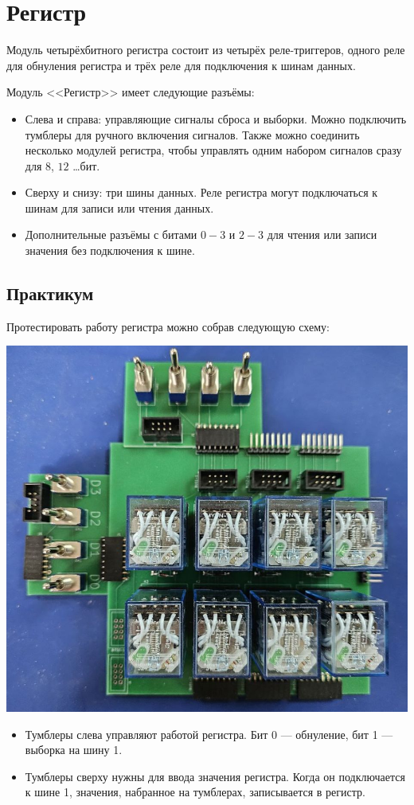 \documentclass{book}
\begin{document}
\section{Регистр}

Модуль четырёхбитного регистра состоит из четырёх реле-триггеров,
одного реле для обнуления регистра и трёх реле для подключения
к шинам данных.

Модуль <<Регистр>> имеет следующие разъёмы:
\begin{itemize}
  \item Слева и справа: управляющие сигналы сброса и выборки.
        Можно подключить тумблеры
        для ручного включения сигналов. Также можно соединить несколько
        модулей регистра, чтобы управлять одним набором сигналов сразу
        для $8$, $12$ \ldots бит.
  \item Сверху и снизу: три шины данных. Реле регистра могут
        подключаться к шинам для записи или чтения данных.
  \item Дополнительные разъёмы с битами $0-3$ и $2-3$ для чтения или
        записи значения без подключения к шине.
\end{itemize}

\subsection{Практикум}

Протестировать работу регистра можно собрав следующую схему:

\includegraphics[width=0.5\columnwidth]{photo/register.jpg}

\begin{itemize}
  \item Тумблеры слева управляют работой регистра. Бит 0 --- обнуление, бит 1 --- выборка на шину 1.
  \item Тумблеры сверху нужны для ввода значения регистра. Когда он подключается к шине 1,
        значения, набранное на тумблерах, записывается в регистр.
\end{itemize}
\end{document}
